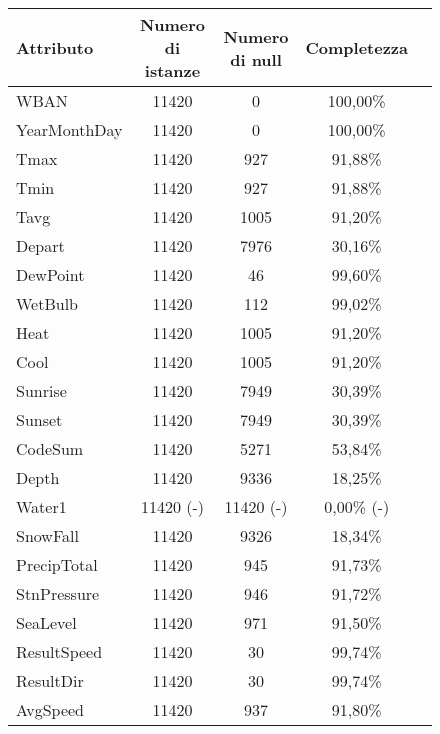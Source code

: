 \begin{figure}[H]
	\centering
	\begin{tabular}{lcccc}
		\toprule
		\textbf{Attributo} \quad & \textbf{Numero di istanze} & \textbf{Numero di null} & \textbf{Completezza} \\
			\midrule
		WBAN	 	&               11420 &  0               & 100,00\% \\
		YearMonthDay&               11420 &  0               & 100,00\% \\
		Tmax	 	&               11420 &  927             & 91,88\% \\
		Tmin	 	&               11420 &  927             & 91,88\% \\
		Tavg	 	&               11420 &  1005            & 91,20\% \\ 
		Depart	 	&               11420 &  7976            & 30,16\% \\ 
		DewPoint	 &              11420  & 46              & 99,60\% \\
		WetBulb	 	&               11420 &  112             & 99,02\% \\
		Heat	 	&               11420 &  1005            & 91,20\% \\ 
		Cool	 	&               11420 &  1005            & 91,20\% \\ 
		Sunrise	 	&               11420 &  7949            & 30,39\% \\ 
		Sunset	 	&               11420 &  7949            & 30,39\% \\ 
		CodeSum	 	&               11420 &  5271            & 53,84\% \\ 
		Depth	 	&               11420 &  9336            & 18,25\% \\ 
		Water1	 	&               11420 (-) &  11420 (-)          & 0,00\% (-) \\ 
		SnowFall	 &              11420  & 9326            & 18,34\% \\ 
		PrecipTotal	 &              11420  & 945             & 91,73\% \\ 
		StnPressure	 &              11420  & 946             & 91,72\% \\ 
		SeaLevel	 &              11420  & 971             & 91,50\% \\ 
		ResultSpeed	 &              11420  & 30              & 99,74\% \\
		ResultDir	 &              11420  & 30              & 99,74\% \\
		AvgSpeed	 &              11420  & 937             & 91,80\% \\

\end{tabular}
\end{figure}

